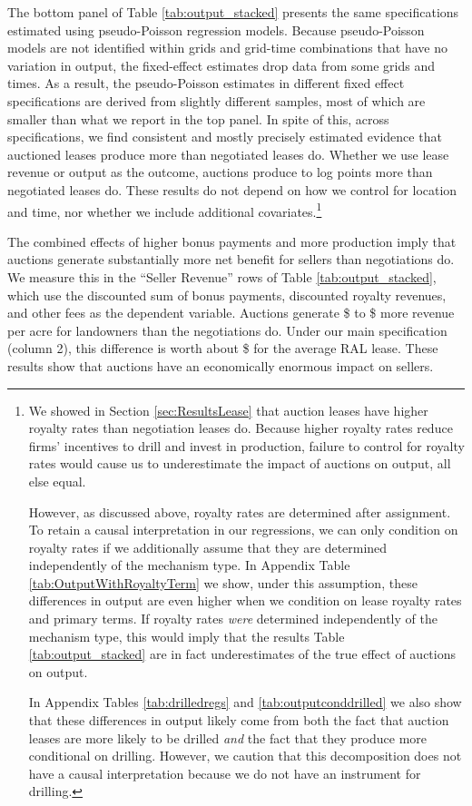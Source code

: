 The bottom panel of Table \ref{tab:output_stacked} presents the same specifications estimated using pseudo-Poisson regression models.  Because pseudo-Poisson models are not identified within grids and grid-time combinations that have no variation in output, the fixed-effect estimates drop data from some grids and times.  As a result, the pseudo-Poisson estimates in different fixed effect specifications are derived from slightly different samples, most of which are smaller than what we report in the top panel.  In spite of this, across specifications, we find consistent and mostly precisely estimated evidence that auctioned leases produce more than negotiated leases do.  Whether we use lease revenue or output as the outcome, auctions produce  to  log points more than negotiated leases do.  These results do not depend on how we control for location and time, nor whether we include additional covariates.\footnote{We showed in Section \ref{sec:ResultsLease} that auction leases have higher royalty rates than negotiation leases do.  Because higher royalty rates reduce firms' incentives to drill and invest in production, failure to control for royalty rates would cause us to underestimate the impact of auctions on output, all else equal. 

However, as discussed above, royalty rates are determined after assignment. To retain a causal interpretation in our regressions, we can only condition on royalty rates if we additionally assume that they are determined independently of the mechanism type. In Appendix Table \ref{tab:OutputWithRoyaltyTerm} we show, under this assumption, these differences in output are even higher when we condition on lease royalty rates and primary terms. If royalty rates \emph{were} determined independently of the mechanism type, this would imply that the results Table \ref{tab:output_stacked} are in fact underestimates of the true effect of auctions on output.

In Appendix Tables \ref{tab:drilledregs} and \ref{tab:outputconddrilled} we also show that these differences in output likely come from both the fact that auction leases are more likely to be drilled \emph{and} the fact that they produce more conditional on drilling. However, we caution that this decomposition does not have a causal interpretation because we do not have an instrument for drilling.} 

The combined effects of higher bonus payments and more production imply that auctions generate substantially more net benefit for sellers than negotiations do.  We measure this in the ``Seller Revenue'' rows of Table \ref{tab:output_stacked}, which use the discounted sum of bonus payments, discounted royalty revenues, and other fees as the dependent variable.  Auctions generate  \$ to \$ more revenue per acre for landowners than the negotiations do.  Under our main specification (column 2), this difference is worth about \$ for the average RAL lease.  These results show that auctions have an economically enormous impact on sellers.

